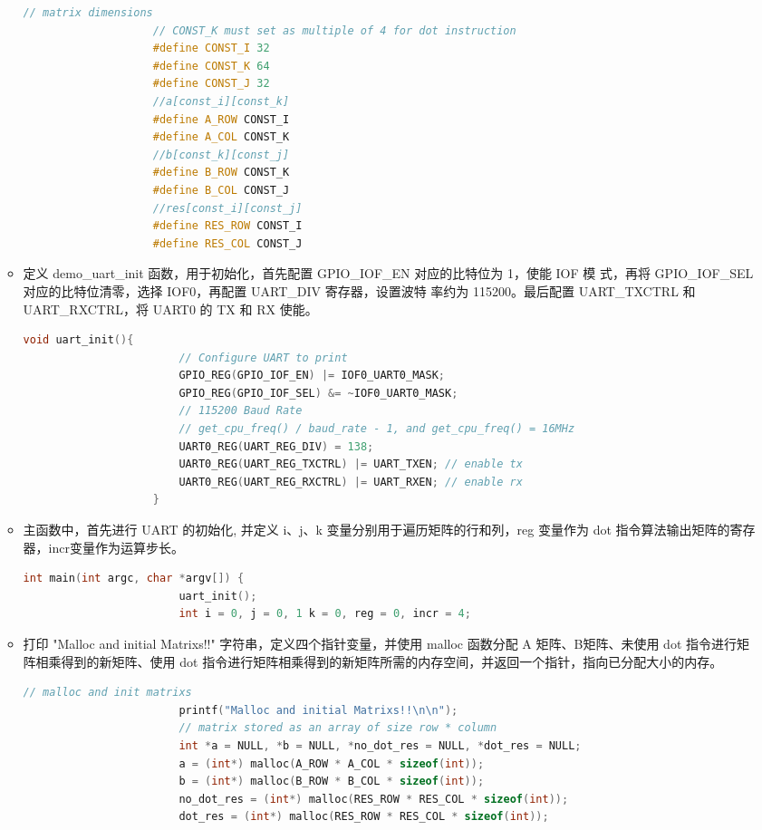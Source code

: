 \documentclass[a4paper, 14pt, oneside]{book} %
\numberwithin{equation}{subsection}
\begin{document}
\begin{enumerate}
\begin{itemize}
\begin{lstlisting}[language={C++}]
					// matrix dimensions
					// CONST_K must set as multiple of 4 for dot instruction
					#define CONST_I 32
					#define CONST_K 64
					#define CONST_J 32
					//a[const_i][const_k]
					#define A_ROW CONST_I
					#define A_COL CONST_K
					//b[const_k][const_j]
					#define B_ROW CONST_K
					#define B_COL CONST_J
					//res[const_i][const_j]
					#define RES_ROW CONST_I
					#define RES_COL CONST_J  
				\end{lstlisting}
				\item 定义 demo\_uart\_init 函数，用于初始化，首先配置 GPIO\_IOF\_EN 对应的比特位为 1，使能 IOF 模
				式，再将 GPIO\_IOF\_SEL 对应的比特位清零，选择 IOF0，再配置 UART\_DIV 寄存器，设置波特
				率约为 115200。最后配置 UART\_TXCTRL 和UART\_RXCTRL，将 UART0 的 TX 和 RX 使能。
				\begin{lstlisting}[language={C++}]
					void uart_init(){
						// Configure UART to print
						GPIO_REG(GPIO_IOF_EN) |= IOF0_UART0_MASK;
						GPIO_REG(GPIO_IOF_SEL) &= ~IOF0_UART0_MASK;
						// 115200 Baud Rate
						// get_cpu_freq() / baud_rate - 1, and get_cpu_freq() = 16MHz
						UART0_REG(UART_REG_DIV) = 138;
						UART0_REG(UART_REG_TXCTRL) |= UART_TXEN; // enable tx
						UART0_REG(UART_REG_RXCTRL) |= UART_RXEN; // enable rx
					}
				\end{lstlisting}
				\item 主函数中，首先进行 UART 的初始化, 并定义 i、j、k 变量分别用于遍历矩阵的行和列，reg 变量作为 dot 指令算法输出矩阵的寄存器，incr变量作为运算步长。
				\begin{lstlisting}[language={C++}]
					int main(int argc, char *argv[]) {
						uart_init();
						int i = 0, j = 0, 1 k = 0, reg = 0, incr = 4;			
					\end{lstlisting}
					\item 打印 "Malloc and initial Matrixs!!" 字符串，定义四个指针变量，并使用 malloc 函数分配 A 矩阵、B矩阵、未使用 dot 指令进行矩阵相乘得到的新矩阵、使用 dot 指令进行矩阵相乘得到的新矩阵所需的内存空间，并返回一个指针，指向已分配大小的内存。
					\begin{lstlisting}[language={C++}]
						// malloc and init matrixs
						printf("Malloc and initial Matrixs!!\n\n");
						// matrix stored as an array of size row * column
						int *a = NULL, *b = NULL, *no_dot_res = NULL, *dot_res = NULL;
						a = (int*) malloc(A_ROW * A_COL * sizeof(int));
						b = (int*) malloc(B_ROW * B_COL * sizeof(int));
						no_dot_res = (int*) malloc(RES_ROW * RES_COL * sizeof(int));
						dot_res = (int*) malloc(RES_ROW * RES_COL * sizeof(int));			

\end{lstlisting}
\end{itemize}
\end{enumerate}
\end{document}
